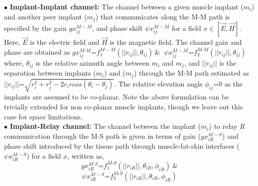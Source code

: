 \noindent$\bullet$ \textbf{Implant-Implant channel:} The channel between a given muscle implant ($m_i$) and another peer implant ($m_j$) that  communicates along the M-M path is specified by the gain $gx_{ij}^{M-M}$, and phase shift $\psi x_{ij}^{M-M}$ for a field $x\in[\overrightarrow{E},\overrightarrow{H}]$. Here,  $\overrightarrow{E}$ is the electric field and $\overrightarrow{H}$ is the magnetic field. The channel gain and phase are obtained as
$gx_{ij}^{M\text{-}M}\text{=} f_1^{M-M}(||r_{ij}||,\theta_{ij}) \, \&\ $
$\psi x_{ij}^{M-M}\text{=} f_2^{M\text{-}M}(||r_{ij}||,\theta_{ij})$
where, $\theta_{ij}$ is the relative azimuth angle between $m_i$ and $m_j$, and $||r_{ij}||$ is the separation between implants ($m_i$) and ($m_j$) through the M-M path estimated as $||r_{ij}||\text{=}\sqrt{r_i^2+r_j^2-2r_ir cos(\theta_i-\theta_j)}$. The relative elevation angle $\phi_{ij}$=$0$ as the implants are assumed to be co-planar. Note the above formulation can be trivially extended for non co-planar muscle implants, though we leave out this case for space limitations.\\
\noindent$\bullet$ \textbf{Implant-Relay channel:} The channel between the implant ($m_i$) to relay $R$ communication through the M-S path is given in terms of gain ($gx_{iR}^{M-S}$) and phase shift introduced by the tissue path through muscle-fat-skin interfaces ($\psi x_{iR}^{M-S}$) for a field $x$, written as,
\begin{equation}\label{e:g}
gx_{iR}^{M\text{-}S}\text{=} f_1^{M\text{-}S}(||r_{iR}||,\theta_{iR},\phi_{iR})\ \&
\end{equation}
\begin{equation} \label{e:psi}
\psi x_{iR}^{M-S}\text{=} f_2^{M\text{-}S}(||r_{iR}||,\theta_{iR},\phi_{iR})
\end{equation}

